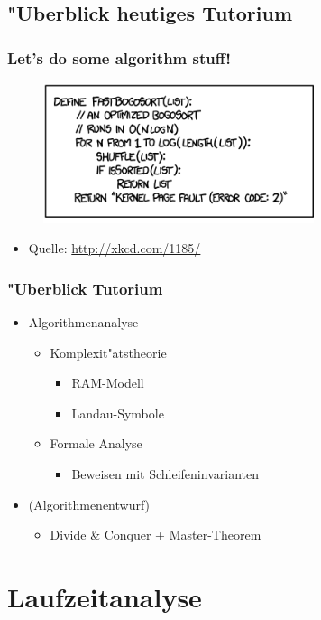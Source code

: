\subsection{"Uberblick heutiges Tutorium}
\begin{frame}[fragile]
  \frametitle{Let's do some algorithm stuff!}
  \begin{figure}[!t]
    \includegraphics[width=300px]{fastbogosort.png}
    \label{fig:fastbogosort}
  \end{figure}
  \begin{itemize}
  \item Quelle: \url{http://xkcd.com/1185/}
  \end{itemize}
\end{frame}

\begin{frame}
  \frametitle{"Uberblick Tutorium}
  \begin{itemize}
  \item Algorithmenanalyse
    \begin{itemize}
    \item Komplexit"atstheorie
      \begin{itemize}
      \item RAM-Modell
      \item Landau-Symbole
      \end{itemize}
    \item Formale Analyse
      \begin{itemize}
      \item Beweisen mit Schleifeninvarianten
      \end{itemize}
    \end{itemize}
  \item (Algorithmenentwurf)
    \begin{itemize}
    \item Divide \& Conquer + Master-Theorem
    \end{itemize}
  \end{itemize}
\end{frame}

\section{Laufzeitanalyse}

